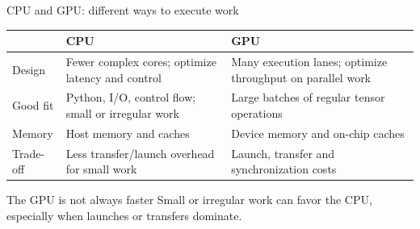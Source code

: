 \documentclass[handout]{beamer}
\begin{document}
\begin{frame}{CPU and GPU: different ways to execute work}
  \small
  \begin{tabular}{@{}>{\raggedright\arraybackslash}p{.18\linewidth}>{\raggedright\arraybackslash}p{.35\linewidth}>{\raggedright\arraybackslash}p{.35\linewidth}@{}}
    \toprule
    & CPU & GPU \\
    \midrule
    Design & Fewer complex cores; optimize latency and control & Many execution lanes; optimize throughput on parallel work \\
    Good fit & Python, I/O, control flow; small or irregular work & Large batches of regular tensor operations \\
    Memory & Host memory and caches & Device memory and on-chip caches \\
    Trade-off & Less transfer/launch overhead for small work & Launch, transfer and synchronization costs \\
    \bottomrule
  \end{tabular}
  \vfill
  \begin{alertblock}{The GPU is not always faster}
    Small or irregular work can favor the CPU, especially when launches or transfers dominate.
  \end{alertblock}
\end{frame}
\end{document}
